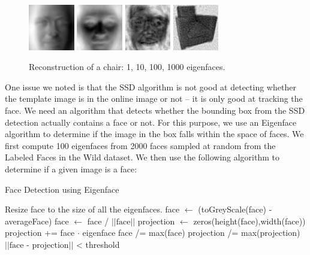 \documentclass[10pt,twocolumn,letterpaper]{article}
\begin{document}
\begin{figure}[ht!]
\centering
\includegraphics[width=20mm]{./eigenface/reconstruction/nonface_proj_1.jpg}
\includegraphics[width=20mm]{./eigenface/reconstruction/nonface_proj_10.jpg}
\includegraphics[width=20mm]{./eigenface/reconstruction/nonface_proj_100.jpg}
\includegraphics[width=20mm]{./eigenface/reconstruction/nonface_proj_1000.jpg}
\caption{Reconstruction of a chair: 1, 10, 100, 1000 eigenfaces.\label{overflow}}
\end{figure}



One issue we noted is that the SSD algorithm is not good at detecting whether the template image is in the online image or not -- it is only good at tracking the face. We need an algorithm that detects whether the bounding box from the SSD detection actually contains a face or not. For this purpose, we use an Eigenface algorithm \cite{eigenfaces} to determine if the image in the box falls within the space of faces. We first compute 100 eigenfaces from 2000 faces sampled at random from the Labeled Faces in the Wild \cite{lfw} dataset. We then use the following algorithm to determine if a given image is a face:

\begin{algorithm}
 \caption{Face Detection using Eigenface}
 \begin{algorithmic}[1]
  \State Resize face to the size of all the eigenfaces.
  \State face $\leftarrow$ (toGreyScale(face) - averageFace)
  \State face $\leftarrow$ face / $||\mbox{face}||$
  \State projection $\leftarrow$ zeros(height(face),width(face))
     \State projection += face $\cdot$ eigenface
  \EndFor
  \State face /= max(face)
  \State projection /= max(projection)
  \State \Return $||\mbox{face - projection}||$ < threshold
  \EndProcedure
 \end{algorithmic}
\end{algorithm}
\end{document}
